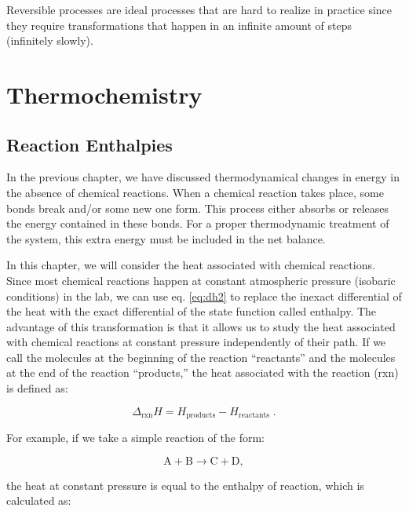 \documentclass[
  9pt,
]{extbook}
\theoremstyle{definition}
\theoremstyle{definition}
\theoremstyle{definition}
\theoremstyle{remark}
\begin{document}
Reversible processes are ideal processes that are hard to realize in practice since they require transformations that happen in an infinite amount of steps (infinitely slowly).

\newcommand*{\standardstate}{{-\kern-6pt{\ominus}\kern-6pt-}}

\hypertarget{Thermochemistry}{%
\chapter{Thermochemistry}\label{Thermochemistry}}

\hypertarget{rxnenthalpy}{%
\section{Reaction Enthalpies}\label{rxnenthalpy}}

In the previous chapter, we have discussed thermodynamical changes in energy in the absence of chemical reactions. When a chemical reaction takes place, some bonds break and/or some new one form. This process either absorbs or releases the energy contained in these bonds. For a proper thermodynamic treatment of the system, this extra energy must be included in the net balance.

In this chapter, we will consider the heat associated with chemical reactions. Since most chemical reactions happen at constant atmospheric pressure (isobaric conditions) in the lab, we can use eq. \eqref{eq:dh2} to replace the inexact differential of the heat with the exact differential of the state function called enthalpy. The advantage of this transformation is that it allows us to study the heat associated with chemical reactions at constant pressure independently of their path. If we call the molecules at the beginning of the reaction ``reactants'' and the molecules at the end of the reaction ``products,'' the heat associated with the reaction (rxn) is defined as:

\begin{equation}
  \Delta_{\text{rxn}} H = H_{\text{products}}-H_{\text{reactants}} \; .
  \label{eq:DHrxn1}
\end{equation}

For example, if we take a simple reaction of the form:

\[ \mathrm{A} + \mathrm{B} \rightarrow \mathrm{C} + \mathrm{D}, \]

the heat at constant pressure is equal to the enthalpy of reaction, which is calculated as:
\end{document}
